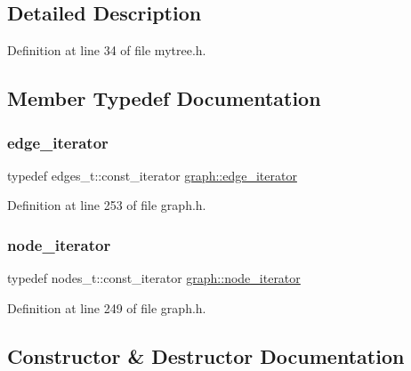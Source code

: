 \subsection{Detailed Description}


Definition at line 34 of file mytree.\+h.



\subsection{Member Typedef Documentation}
\mbox{\label{classgraph_a818d3766018eb0af91d520ce2150203c}} 
\subsubsection{\texorpdfstring{edge\+\_\+iterator}{edge\_iterator}}
{\footnotesize\ttfamily typedef edges\+\_\+t\+::const\+\_\+iterator \mbox{\hyperlink{classgraph_a818d3766018eb0af91d520ce2150203c}{graph\+::edge\+\_\+iterator}}\hspace{0.3cm}{\ttfamily [inherited]}}



Definition at line 253 of file graph.\+h.

\mbox{\label{classgraph_a2cb374b84c133ce13f94e73c3e5da7fa}} 
\subsubsection{\texorpdfstring{node\+\_\+iterator}{node\_iterator}}
{\footnotesize\ttfamily typedef nodes\+\_\+t\+::const\+\_\+iterator \mbox{\hyperlink{classgraph_a2cb374b84c133ce13f94e73c3e5da7fa}{graph\+::node\+\_\+iterator}}\hspace{0.3cm}{\ttfamily [inherited]}}



Definition at line 249 of file graph.\+h.



\subsection{Constructor \& Destructor Documentation}
\mbox{\label{class_my_tree_a18f3e28586b77d44f5f2c12155d6794b}} 
